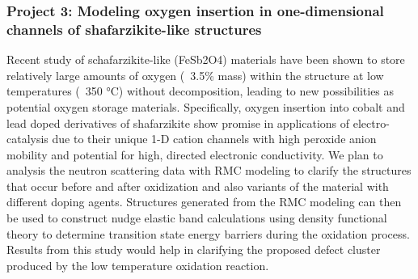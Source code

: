 \subsubsection*{Project 3: Modeling oxygen insertion in one-dimensional channels of shafarzikite-like structures}\label{deLaune}
Recent study of schafarzikite-like (FeSb2O4) materials have been shown to store relatively large amounts of oxygen (~3.5\% mass)
within the structure at low temperatures (~350 °C) without decomposition, leading to new possibilities as potential oxygen storage materials. Specifically, oxygen insertion into cobalt and lead doped derivatives of shafarzikite show promise in applications of electro-catalysis due to their unique 1-D cation channels with high peroxide anion mobility and potential for high, directed electronic conductivity. We plan to analysis the neutron scattering data with RMC modeling to clarify the structures that occur before and after oxidization and also variants of the material with different doping agents. Structures generated from the RMC modeling can then be used to construct nudge elastic band calculations using density functional theory to determine transition state energy barriers during the oxidation process. Results from this study would help in clarifying the proposed defect cluster produced by the low temperature oxidation reaction.